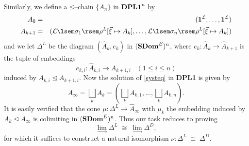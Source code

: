 Similarly, we define a $\unlhd$--chain $\{ A_{n} \}$ in ${\bf DPL1}^{n}$ by 
\begin{eqnarray*}
A_{0} & = &  ({\bf 1}^{\cal L}, \ldots , {\bf 1}^{\cal L}) \\
A_{k+1} & = & ({\cal L} \lsem \sigma_{1} \rsem \rho^{L} [\vec{\xi} \mapsto A_{k}], \ldots , {\cal L} \lsem \sigma_{n} \rsem \rho^{L} [\vec{\xi} \mapsto A_{k}])
\end{eqnarray*}
and we let $\Delta^{L}$ be the diagram $(\hat{A}_{k}, e_{k})$ in $({\bf SDom}^{E})^{n}$, where $e_{k} : \hat{A}_{k} \rightarrow \hat{A}_{k+1}$ is the tuple of embeddings 
\[ e_{k, i} : \hat{A}_{k, i} \rightarrow \hat{A}_{k+1, i} \;\;\; (1 \leq i \leq n) \] 
induced by $A_{k, i} \unlhd A_{k+1, i}$. 
Now the solution of \ref{systeq} in {\bf DPL1} is given by 
\[ A_{\infty} = \bigsqcup_{k} A_{k} = (\bigsqcup_{k} A_{k, 1}, \ldots , \bigsqcup_{k} A_{k, n}). \]
It is easily verified that the cone 
$\mu : \Delta^{L} \rightarrow \hat{A}_{\infty}$ with $\mu_{k}$ the embedding induced by $A_{k} \unlhd A_{\infty}$ is colimiting in $({\bf SDom}^{E})^{n}$. 
Thus our task reduces to proving
\[ \lim_{\rightarrow} \Delta^{L} \; \cong \; \lim_{\rightarrow} \Delta^{D}, \]
for which it suffices to construct a natural isomorphism $\nu : \Delta^{L} \; \cong \; \Delta^{D}$.

